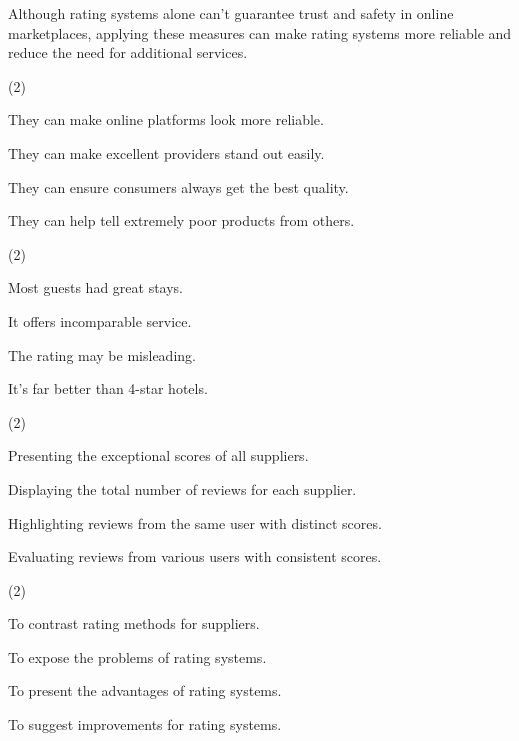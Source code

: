 \documentclass{英语试卷}
\begin{document}
\par Although rating systems alone can't guarantee trust and safety in online marketplaces, applying these measures can make rating systems more reliable and reduce the need for additional services.\par
{}
\begin{choices}(2)
  \item They can make online platforms look more reliable.
  \item They can make excellent providers stand out easily.
  \item They can ensure consumers always get the best quality.
  \item They can help tell extremely poor products from others.
\end{choices}
\begin{choices}(2)
  \item Most guests had great stays.
  \item It offers incomparable service.
  \item The rating may be misleading.
  \item It's far better than 4-star hotels.
\end{choices}
\begin{choices}(2)
  \item Presenting the exceptional scores of all suppliers.
  \item Displaying the total number of reviews for each supplier.
  \item Highlighting reviews from the same user with distinct scores.
  \item Evaluating reviews from various users with consistent scores.
\end{choices}
\begin{choices}(2)
  \item To contrast rating methods for suppliers.
  \item To expose the problems of rating systems.
  \item To present the advantages of rating systems.
  \item To suggest improvements for rating systems.
\end{choices}
\end{document}
